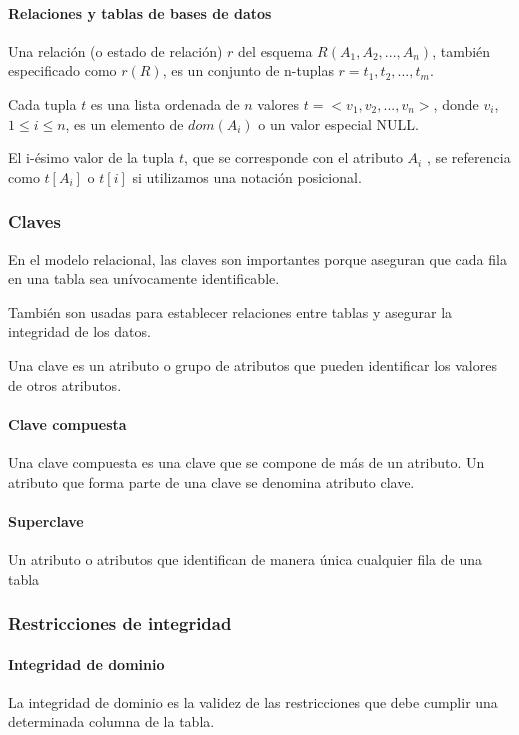 \paragraph*{Relaciones y tablas de bases de datos}   
Una relación (o estado de relación) $r$ del esquema $R(A_1, A_2,..., A_n)$, también especificado como $r(R)$, es un conjunto de n-tuplas $r={t_1, t_2,..., t_m}$.


Cada tupla $t$ es una lista ordenada de $n$ valores $t=<v_1, v_2,...,v_n>$, donde $v_i$, $1 \leq i \leq n$, es un elemento de $dom(A_i)$ o un valor especial NULL.


El i-ésimo valor de la tupla $t$, que se corresponde con el atributo $A_i$ , se referencia como $t[A_i]$ o $t[i]$ si utilizamos una notación posicional.

\subsubsection{Claves}

En el modelo relacional, las claves son importantes porque aseguran que cada fila en una tabla sea unívocamente identificable. 

También son usadas para establecer relaciones entre tablas y asegurar la integridad de los datos.

Una clave es un atributo o grupo de atributos que pueden identificar los valores de otros atributos. 

\paragraph*{Clave compuesta}
Una clave compuesta es una clave que se compone de más de un atributo. Un atributo que forma parte de una clave se denomina atributo clave.

\paragraph*{Superclave}
Un atributo o atributos que identifican de manera única cualquier fila de una tabla

\subsubsection{Restricciones de integridad}
\paragraph*{Integridad de dominio}
La integridad de dominio es la validez de las restricciones que debe cumplir una determinada columna de la tabla.
